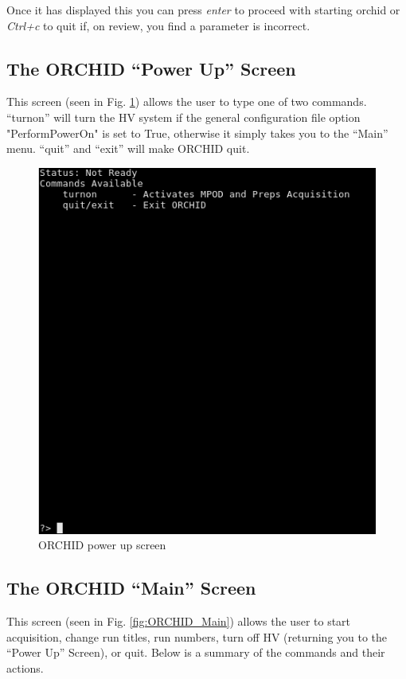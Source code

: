 \documentclass[onecolumn, 10pt, letterpaper, twoside]{article}
\begin{document}
Once it has displayed this you can press \emph{enter} to proceed with starting orchid or \emph{Ctrl+c} to quit if, on review, you find a parameter is incorrect.
\clearpage{}
\subsection{The ORCHID ``Power Up'' Screen}
This screen (seen in Fig. \ref{fig:ORCHID_Powerup}) allows the user to type one of two commands. ``turnon'' will turn the HV system if the general configuration file option "PerformPowerOn" is set to True, otherwise it simply takes you to the ``Main'' menu. ``quit'' and ``exit'' will make ORCHID quit.
\begin{figure}[h!]
\begin{center}
\includegraphics[width=\textwidth]{./Powerup_Menu.png}
\caption{ORCHID power up screen}
\label{fig:ORCHID_Powerup}
\end{center}
\end{figure}

\subsection{The ORCHID ``Main'' Screen}
This screen (seen in Fig. \ref{fig:ORCHID_Main}) allows the user to start acquisition, change run titles, run numbers, turn off HV (returning you to the ``Power Up'' Screen), or quit. Below is a summary of the commands and their actions.
\end{document}
